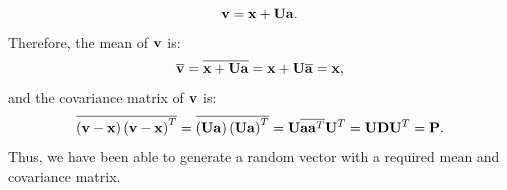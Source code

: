 \documentclass[12pt]{article}
\begin{document}
\begin{itemize}
\begin{equation}
{\bf v} = {\bf x} + {\bf U} {\bf a}.
\end{equation}
Therefore, the mean of ${\bf v}$ is:
\begin{equation}
\overline{ {\bf v} } = \overline{ {\bf x} + {\bf U} {\bf a} } = {\bf x} + {\bf U} \overline{ {\bf a} } = {\bf x},
\end{equation}
and the covariance matrix of ${\bf v}$ is:
\begin{equation}
\overline{ \left( {\bf v} - {\bf x} \right) \left( {\bf v} - {\bf x} \right)^T } = \overline{ \left( {\bf U} {\bf a} \right) \left( {\bf U} {\bf a} \right)^T } = {\bf U} \overline{ {\bf a} {\bf a}^T } {\bf U}^T = {\bf U} {\bf D} {\bf U}^T = {\bf P}.
\end{equation}
Thus, we have been able to generate a random vector with a required mean and covariance matrix.
\end{itemize} 
\end{document}
